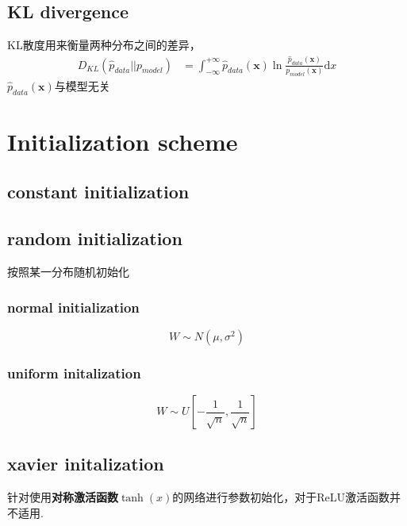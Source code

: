 \subsection{KL divergence}
KL散度用来衡量两种分布之间的差异，
\begin{equation}
    \begin{split}
        D_{KL}(\hat p_{data}|| p_{model}) &= \int_{-\infty}^{+\infty} \hat p_{data}(\boldsymbol{x}) \ln{\frac{\hat p_{data}(\boldsymbol{x})}{p_{model}(\boldsymbol{x})}} \mathrm{d}x
    \end{split}
\end{equation}
$\hat p_{data}(\boldsymbol{x})$与模型无关

\section{Initialization scheme}
\subsection{constant initialization}

\subsection{random initialization}
按照某一分布随机初始化
\subsubsection{normal initialization}
\begin{equation}
    W \sim N(\mu, \sigma^2)
\end{equation}

\subsubsection{uniform initalization}
\begin{equation}
    W \sim U[-\frac{1}{\sqrt{n}}, \frac{1}{\sqrt{n}}]
\end{equation}

\subsection{xavier initalization}
针对使用\textbf{对称激活函数}$\tanh(x)$的网络进行参数初始化，对于ReLU激活函数并不适用\cite{Glorot2010}.

